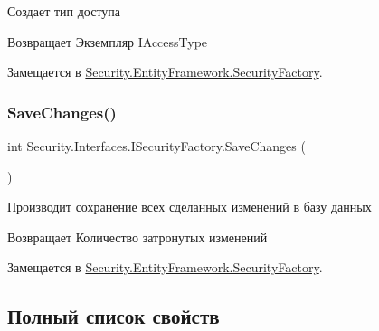 Создает тип доступа 

\begin{DoxyReturn}{Возвращает}
Экземпляр I\+Access\+Type
\end{DoxyReturn}


Замещается в \hyperlink{class_security_1_1_entity_framework_1_1_security_factory_ad96cae2f018cdbb3245b2c00c0f37db2}{Security.\+Entity\+Framework.\+Security\+Factory}.

\mbox{\label{interface_security_1_1_interfaces_1_1_i_security_factory_a2af6dff231f7099ba7d02e2bc569683a}} 
\subsubsection{\texorpdfstring{Save\+Changes()}{SaveChanges()}}
{\footnotesize\ttfamily int Security.\+Interfaces.\+I\+Security\+Factory.\+Save\+Changes (\begin{DoxyParamCaption}{ }\end{DoxyParamCaption})}



Производит сохранение всех сделанных изменений в базу данных 

\begin{DoxyReturn}{Возвращает}
Количество затронутых изменений
\end{DoxyReturn}


Замещается в \hyperlink{class_security_1_1_entity_framework_1_1_security_factory_a638532b6e8fd71f5f82170abee4ae433}{Security.\+Entity\+Framework.\+Security\+Factory}.



\subsection{Полный список свойств}
\mbox{\label{interface_security_1_1_interfaces_1_1_i_security_factory_ada601a36a0c0a5dfc55a9433fb617055}} 
